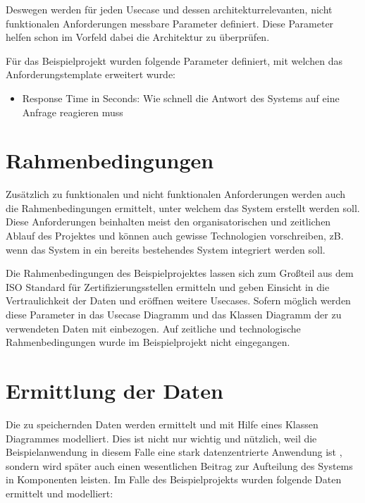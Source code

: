 Deswegen werden für jeden Usecase und dessen architekturrelevanten, nicht funktionalen Anforderungen messbare Parameter definiert. Diese Parameter helfen schon im Vorfeld dabei die Architektur zu überprüfen.

Für das Beispielprojekt wurden folgende Parameter definiert, mit welchen das Anforderungstemplate erweitert wurde:

\begin{itemize}
  \item Response Time in Seconds: Wie schnell die Antwort des Systems auf eine Anfrage reagieren muss
\end{itemize}

\section{Rahmenbedingungen}
Zusätzlich zu funktionalen und nicht funktionalen Anforderungen werden auch die Rahmenbedingungen ermittelt, unter welchem das System erstellt werden soll. Diese Anforderungen beinhalten meist den organisatorischen und zeitlichen Ablauf des Projektes und können auch gewisse Technologien vorschreiben, zB. wenn das System in ein bereits bestehendes System integriert werden soll. \cite[S. 9]{review}\cite[S. 110]{softarch}

Die Rahmenbedingungen des Beispielprojektes lassen sich zum Großteil aus dem ISO Standard für Zertifizierungsstellen ermitteln \cite{ISO_CERT} und geben Einsicht in die Vertraulichkeit der Daten und eröffnen weitere Usecases. Sofern möglich werden diese Parameter in das Usecase Diagramm und das Klassen Diagramm der zu verwendeten Daten mit einbezogen. Auf zeitliche und technologische Rahmenbedingungen wurde im Beispielprojekt nicht eingegangen.

\section{Ermittlung der Daten}
Die zu speichernden Daten werden ermittelt und mit Hilfe eines Klassen Diagrammes modelliert. Dies ist nicht nur wichtig und nützlich, weil die Beispielanwendung in diesem Falle eine stark datenzentrierte Anwendung ist \cite[S. 105]{effektiv}, sondern wird später auch einen wesentlichen Beitrag zur Aufteilung des Systems in Komponenten leisten. Im Falle des Beispielprojekts wurden folgende Daten ermittelt und modelliert:

